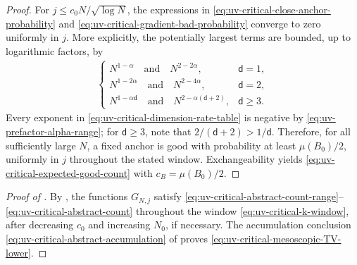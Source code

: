 \documentclass[11pt,reqno]{amsart}
\numberwithin{equation}{section}
\theoremstyle{plain}
\theoremstyle{remark}
\renewcommand{\d}{\mathsf{d}}
\begin{document}
\begin{proof}
For \(j\le c_0N/\sqrt{\log N}\), the expressions in \eqref{eq:uv-critical-close-anchor-probability} and \eqref{eq:uv-critical-gradient-bad-probability} converge to zero uniformly in \(j\).  More explicitly, the potentially largest terms are bounded, up to logarithmic factors, by
\begin{align}\label{eq:uv-critical-dimension-rate-table}
 \begin{cases}
 N^{1-\alpha}\quad\text{and}\quad N^{2-2\alpha},&\d=1,\\
 N^{1-2\alpha}\quad\text{and}\quad N^{2-4\alpha},&\d=2,\\
 N^{1-\alpha\d}\quad\text{and}\quad N^{2-\alpha(\d+2)},&\d\ge3.
 \end{cases}
\end{align}
Every exponent in \eqref{eq:uv-critical-dimension-rate-table} is negative by \eqref{eq:uv-prefactor-alpha-range}; for \(\d\ge3\), note that \(2/(\d+2)>1/\d\).  Therefore, for all sufficiently large \(N\), a fixed anchor is good with probability at least \(\mu(B_0)/2\), uniformly in \(j\) throughout the stated window.  Exchangeability yields \eqref{eq:uv-critical-expected-good-count} with \(c_B=\mu(B_0)/2\).
\end{proof}

\begin{proof}[Proof of ]
By , the functions \(G_{N,j}\) satisfy \eqref{eq:uv-critical-abstract-count-range}--\eqref{eq:uv-critical-abstract-count} throughout the window \eqref{eq:uv-critical-k-window}, after decreasing \(c_0\) and increasing \(N_0\), if necessary.  The accumulation conclusion \eqref{eq:uv-critical-abstract-accumulation} of  proves \eqref{eq:uv-critical-mesoscopic-TV-lower}.
\end{proof}
\end{document}
